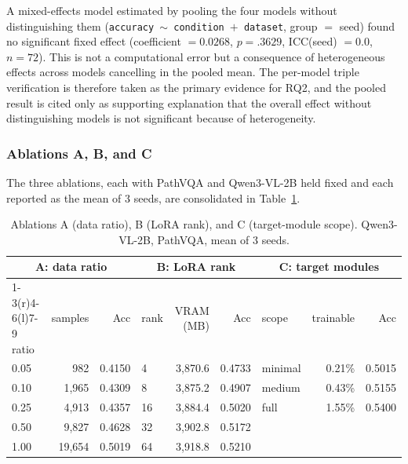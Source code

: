 A mixed-effects model estimated by pooling the four models without distinguishing
them (\texttt{accuracy $\sim$ condition $+$ dataset}, group $=$ seed) found no
significant fixed effect (coefficient $= 0.0268$, $p = .3629$, ICC(seed) $= 0.0$,
$n = 72$). This is not a computational error but a consequence of heterogeneous
effects across models cancelling in the pooled mean. The per-model triple
verification is therefore taken as the primary evidence for RQ2, and the pooled
result is cited only as supporting explanation that the overall effect without
distinguishing models is not significant because of heterogeneity.

\subsubsection{Ablations A, B, and C}

The three ablations, each with PathVQA and Qwen3-VL-2B held fixed and each
reported as the mean of 3 seeds, are consolidated in Table~\ref{tab:ablations}.

\begin{table}[t]
\centering
\caption{Ablations A (data ratio), B (LoRA rank), and C (target-module scope).
Qwen3-VL-2B, PathVQA, mean of 3 seeds.}
\label{tab:ablations}
\small
\begin{tabular}{@{}lrr@{\hspace{2em}}lrr@{\hspace{2em}}lrr@{}}
\toprule
\multicolumn{3}{c}{A: data ratio} & \multicolumn{3}{c}{B: LoRA rank} & \multicolumn{3}{c}{C: target modules} \\
\cmidrule(r){1-3}\cmidrule(r){4-6}\cmidrule(l){7-9}
ratio & samples & Acc & rank & VRAM (MB) & Acc & scope & trainable & Acc \\
\midrule
0.05 & 982    & 0.4150 & 4  & 3,870.6 & 0.4733 & minimal & 0.21\% & 0.5015 \\
0.10 & 1,965  & 0.4309 & 8  & 3,875.2 & 0.4907 & medium  & 0.43\% & 0.5155 \\
0.25 & 4,913  & 0.4357 & 16 & 3,884.4 & 0.5020 & full    & 1.55\% & 0.5400 \\
0.50 & 9,827  & 0.4628 & 32 & 3,902.8 & 0.5172 & & & \\
1.00 & 19,654 & 0.5019 & 64 & 3,918.8 & 0.5210 & & & \\
\bottomrule
\end{tabular}
\end{table}

